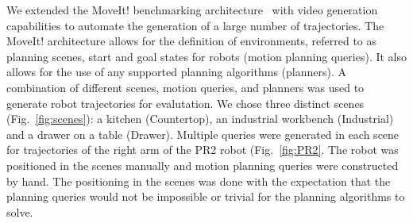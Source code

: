 \documentclass[letterpaper, 10 pt, conference]{ieeeconf}  %
\begin{document}
We extended the MoveIt! benchmarking architecture~\cite{cohen2012generic} with video generation capabilities to automate the generation of a large number of trajectories. The MoveIt! architecture allows for the definition of environments, referred to as planning scenes, start and goal states for robots (motion planning queries). It also allows for the use of any supported planning algorithms (planners). A combination of different scenes, motion queries, and planners was used to generate robot trajectories for evalutation. We chose three distinct scenes (Fig.~\ref{fig:scenes}): a kitchen (Countertop), an industrial workbench (Industrial) and a drawer on a table (Drawer). Multiple queries were generated in each scene for trajectories of the right arm of the PR2 robot (Fig.~\ref{fig:PR2}. The robot was positioned in the scenes manually and motion planning queries were constructed by hand. The positioning in the scenes was done with the expectation that the planning queries would not be impossible or trivial for the planning algorithms to solve. 

\begin{table}[t]
\centering
{}
\caption{The four rating categories/attributes and the associated scales for each presented to the survey respondent.}
\label{tab:rating_scales}
\vspace{-0.2in}
\end{table}

\end{document}
